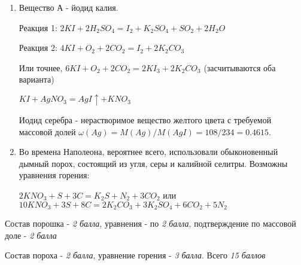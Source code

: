 \solutionSection

\begin{enumerate}
    \item Вещество А - йодид калия.

    Реакция 1: $2KI + 2H_2SO_4 = I_2 + K_2SO_4 + SO_2 + 2H_2O$

    Реакция 2: $4KI + O_2 + 2CO_2 = I_2 + 2K_2CO_3$
    
    Или точнее, $6KI + O_2 + 2CO_2 = 2KI_3 + 2K_2CO_3$ (засчитываются оба варианта)

    $KI + AgNO_3 = AgI \uparrow + KNO_3$

    Иодид серебра - нерастворимое вещество желтого цвета с требуемой массовой долей $\omega(Ag)= M(Ag)/M(AgI) = 108/234 = 0.4615$.
    \item Во времена Наполеона, вероятнее всего, использовали обыконовенный дымный порох, состоящий из угля, серы и калийной селитры. Возможны уравнения горения:
    
    $2KNO_3 + S + 3C = K_2S + N_2 + 3CO_2$ или \\$10KNO_3 + 3S + 8C = 2K_2CO_3 + 3K_2SO_4 + 6CO_2 + 5N_2$
    
\end{enumerate}

\additionalCriteria

Состав порошка - \textit{2 балла}, уравнения - по \textit{2 балла}, подтверждение по массовой доле - \textit{2 балла}

Состав пороха - \textit{2 балла},  уравнение горения - \textit{3 балла}. Всего \textit{15 баллов}
